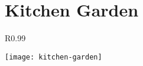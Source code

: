 \documentclass[a4paper,10pt]{book}%
\begin{document}
\chapter[Kitchen Garden]{Kitchen Garden}\begin{wrapfigure}{R}{0.99\textwidth}
         \vspace{-1cm}
        \begin{center}
        \texttt{[image: kitchen-garden]}
        \end{center}
         \vspace{-1cm}
    \end{wrapfigure}


































%
%

\end{document}
